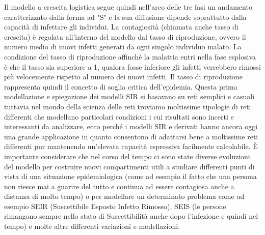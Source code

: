 Il modello a crescita logistica segue quindi nell'arco delle tre fasi un andamento caratterizzato dalla forma ad "S" e la sua diffusione dipende soprattutto dalla capacità di infettare gli individui. La contagiosità (chiamata anche tasso di crescita) è regolata all'interno del modello dal tasso di riproduzione, ovvero il numero medio di nuovi infetti generati da ogni singolo individuo malato.
La condizione del tasso di riproduzione affinché la malattia entri nella fase esplosiva è che il tasso sia superiore a 1, qualora fosse inferiore gli infetti verrebbero rimossi più velocemente rispetto al numero dei nuovi infetti. Il tasso di riproduzione rappresenta quindi il concetto di soglia critica dell'epidemia.
Questa prima modellazione e spiegazione dei modelli SIR si basavano su reti semplici e casuali tuttavia nel mondo della scienza delle reti troviamo moltissime tipologie di reti differenti che modellano particolari condizioni i cui risultati sono incerti e interessanti da analizzare, ecco perché i modelli SIR e derivati hanno ancora oggi una grande applicazione in quanto consentono di adattarsi bene a moltissime reti differenti pur mantenendo un'elevata capacità espressiva facilmente calcolabile.
È importante considerare che nel corso del tempo ci sono state diverse evoluzioni del modello per costruire nuovi compartimenti utili a studiare differenti punti di vista di una situazione epidemiologica (come ad esempio il fatto che una persona non riesce mai a guarire del tutto e continua ad essere contagiosa anche a distanza di molto tempo) o per modellare un determinato problema come ad esempio SEIR (Suscettibile Esposto Infetto Rimosso), SEIS (le persone rimangono sempre nello stato di Suscettibilità anche dopo l'infezione e quindi nel tempo) e molte altre differenti variazioni e modellazioni.